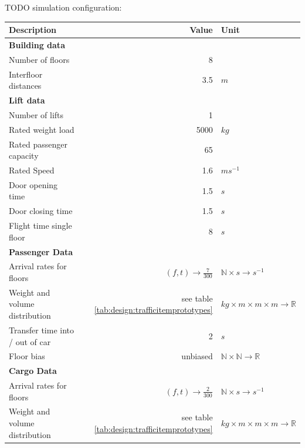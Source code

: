 TODO simulation configuration:
\autocite[][p.~347]{barney2016handbook}


\begin{table}[]
\centering
\begin{tabular}{lrl}
\textbf{Description} \hspace{4cm}   & \textbf{Value}   & \textbf{Unit}   \\
\hline
\multicolumn{3}{l}{\textbf{Building data}} \\
Number of floors & 8 &        \\
Interfloor distances & 3.5 & $m$\\
\hline
\multicolumn{3}{l}{\textbf{Lift data}}     \\
Number of lifts & 1 & \\
Rated weight load & 5000 & $kg$\\
Rated passenger capacity & 65 & \\
Rated Speed & 1.6 & $ms^{-1}$ \\
Door opening time & 1.5 & $s$\\
Door closing time & 1.5 & $s$\\
Flight time single floor & 8 & $s$\\
\hline
\multicolumn{3}{l}{\textbf{Passenger Data}}\\
Arrival rates for floors & $ (f, t) \rightarrow \frac{7}{300} $ & $ \mathbb{N} \times s \rightarrow s^{-1}$\\
Weight and volume distribution & see table \ref{tab:design:trafficitemprototypes} & $kg \times m \times m \times m \rightarrow \mathbb{R}$\\
Transfer time into / out of car & 2 & $s$\\
Floor bias & unbiased & $ \mathbb{N} \times \mathbb{N} \rightarrow \mathbb{R} $ \\
\hline
\multicolumn{3}{l}{\textbf{Cargo Data}}\\
Arrival rates for floors & $ (f, t) \rightarrow \frac{2}{300} $ & $\mathbb{N} \times s \rightarrow s^{-1}$\\
Weight and volume distribution & see table \ref{tab:design:trafficitemprototypes} & $kg \times m \times m \times m \rightarrow \mathbb{R}$\\

\end{tabular}
\end{table}
